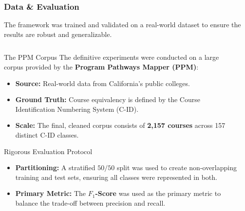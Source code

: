 \documentclass[aspectratio=169,10pt]{beamer}
\begin{document}
\begin{frame}
    \frametitle{Data \& Evaluation}
    \fontsize{9}{9}\selectfont
    
    The framework was trained and validated on a real-world dataset to ensure the results are robust and generalizable.
    
    \fontsize{8}{7}\selectfont
    \begin{columns}[T]
        \begin{column}{0.5\textwidth}
            \begin{block}{The PPM Corpus}
                The definitive experiments were conducted on a large corpus provided by the \textbf{Program Pathways Mapper (PPM)}:
                \begin{itemize}
                    \item \textbf{Source:} Real-world data from California's public colleges.
                    \item \textbf{Ground Truth:} Course equivalency is defined by the Course Identification Numbering System (C-ID).
                    \item \textbf{Scale:} The final, cleaned corpus consists of \textbf{2,157 courses} across 157 distinct C-ID classes.
                \end{itemize}
            \end{block}
            
            \vspace{-2mm}
            
            \begin{alertblock}{Rigorous Evaluation Protocol}
                \begin{itemize}
                    \item \textbf{Partitioning:} A stratified \(50/50\) split was used to create non-overlapping training and test sets, ensuring all classes were represented in both.
                    \item \textbf{Primary Metric:} The \textbf{\(F_1\)-Score} was used as the primary metric to balance the trade-off between precision and recall.
                \end{itemize}
            \end{alertblock}
        \end{column}
        
        \begin{column}{0.5\textwidth}
            

\end{column}
\end{columns}
\end{frame}
\end{document}
